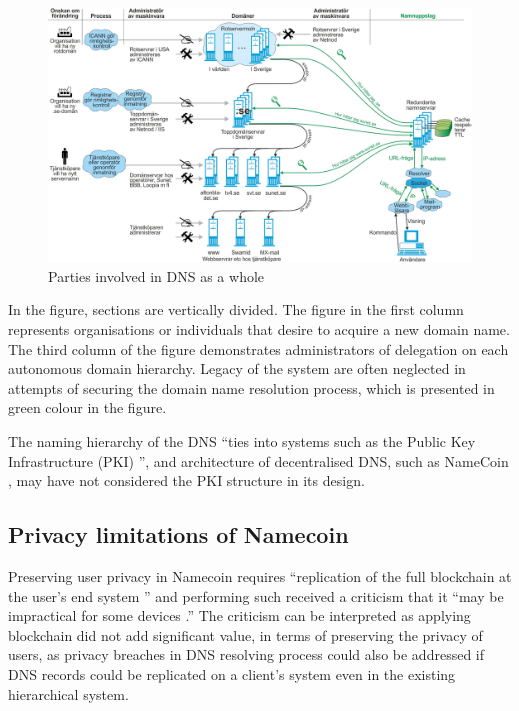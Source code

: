 \begin{figure}[h!]
    \begin{center}
    \includegraphics*[width=1\columnwidth]{img/DNS-maskinvara}
    \end{center}
    \caption{Parties involved in DNS as a whole \cite{SUNET-DNS}}
    \label{dnsactors}
\end{figure}

In the figure, sections are vertically divided.
The figure in the first column represents organisations or individuals that desire to acquire a new domain name.
The third column of the figure demonstrates administrators of delegation on each autonomous domain hierarchy.
Legacy of the system are often neglected in attempts of securing the domain name resolution process, which is presented in green colour in the figure. 

The naming hierarchy of the DNS ``ties into systems such as the Public Key Infrastructure (PKI) \cite{akamai-dns-architecture}'', and architecture of decentralised DNS, such as NameCoin \cite{loibl2014namecoin}, may have not considered the PKI structure in its design.

\subsection{Privacy limitations of Namecoin}
Preserving user privacy in Namecoin requires ``replication of the full blockchain at the user's end system \cite{grothoff2017nsa}'' and performing such received a criticism that it ``may be impractical for some devices \cite{grothoff2017nsa}.''
The criticism can be interpreted as applying blockchain did not add significant value, in terms of preserving the privacy of users, as privacy breaches in DNS resolving process could also be addressed if DNS records could be replicated on a client's system even in the existing hierarchical system. 

